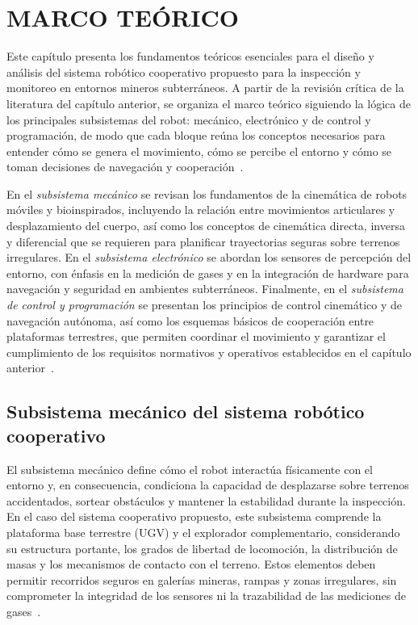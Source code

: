 \chapter{{MARCO TEÓRICO}}

Este capítulo presenta los fundamentos teóricos esenciales para el diseño y análisis del sistema robótico cooperativo propuesto para la inspección y monitoreo en entornos mineros subterráneos. A partir de la revisión crítica de la literatura del capítulo anterior, se organiza el marco teórico siguiendo la lógica de los principales subsistemas del robot: mecánico, electrónico y de control y programación, de modo que cada bloque reúna los conceptos necesarios para entender cómo se genera el movimiento, cómo se percibe el entorno y cómo se toman decisiones de navegación y cooperación~\cite{InsectInspired_2020,AdvancesMining_2023}.

En el \textit{subsistema mecánico} se revisan los fundamentos de la cinemática de robots móviles y bioinspirados, incluyendo la relación entre movimientos articulares y desplazamiento del cuerpo, así como los conceptos de cinemática directa, inversa y diferencial que se requieren para planificar trayectorias seguras sobre terrenos irregulares. En el \textit{subsistema electrónico} se abordan los sensores de percepción del entorno, con énfasis en la medición de gases y en la integración de hardware para navegación y seguridad en ambientes subterráneos. Finalmente, en el \textit{subsistema de control y programación} se presentan los principios de control cinemático y de navegación autónoma, así como los esquemas básicos de cooperación entre plataformas terrestres, que permiten coordinar el movimiento y garantizar el cumplimiento de los requisitos normativos y operativos establecidos en el capítulo anterior~\cite{KimChoi_2025_MineMapping,MINEM_DS024_2016,OSINERGMIN_BoletinGSM_2020b}.


\section{Subsistema mecánico del sistema robótico cooperativo}
\label{sec:subsistema_mecanico}

\hspace{1.25cm}
El subsistema mecánico define cómo el robot interactúa físicamente con el entorno y, en consecuencia, condiciona la capacidad de desplazarse sobre terrenos accidentados, sortear obstáculos y mantener la estabilidad durante la inspección. En el caso del sistema cooperativo propuesto, este subsistema comprende la plataforma base terrestre (UGV) y el explorador complementario, considerando su estructura portante, los grados de libertad de locomoción, la distribución de masas y los mecanismos de contacto con el terreno. Estos elementos deben permitir recorridos seguros en galerías mineras, rampas y zonas irregulares, sin comprometer la integridad de los sensores ni la trazabilidad de las mediciones de gases~\cite{AdvancesMining_2023}.


